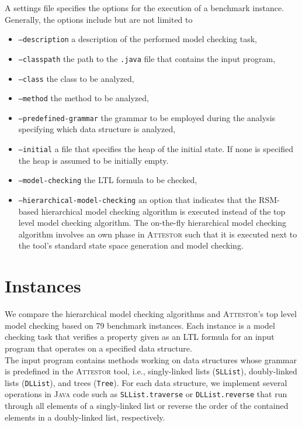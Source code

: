 \documentclass[a4paper, 12pt, twoside]{report}
\begin{document}
	A settings file specifies the options for the execution of a benchmark instance. Generally, the options include but are not limited to
	
	\begin{itemize}
		\item \texttt{--description} a description of the performed model checking task,
		\item \texttt{--classpath} the path to the \texttt{.java} file that contains the input program,
		\item \texttt{--class} the class to be analyzed,
		\item \texttt{--method} the method to be analyzed,
		\item \texttt{--predefined-grammar} the grammar to be employed during the analysis specifying which data structure is analyzed,
		\item \texttt{--initial} a file that specifies the heap of the initial state. If none is specified the heap is assumed to be initially empty.
		\item \texttt{--model-checking} the LTL formula to be checked,
		\item \texttt{--hierarchical-model-checking} an option that indicates that the RSM-based hierarchical model checking algorithm is executed instead of the top level model checking algorithm. The on-the-fly hierarchical model checking algorithm involves an own phase in \textsc{Attestor} such that it is executed next to the tool's standard state space generation and model checking. 
	\end{itemize} 
	
	\section{Instances}
	
	We compare the hierarchical model checking algorithms and \textsc{Attestor}'s top level model checking based on 79 benchmark instances. Each instance is a model checking task that verifies a property given as an LTL formula for an input program that operates on a specified data structure.\\	
		
	The input program contains methods working on data structures whose grammar is predefined in the \textsc{Attestor} tool, i.e., singly-linked lists (\texttt{SLList}), doubly-linked lists (\texttt{DLList}), and trees (\texttt{Tree}). For each data structure, we implement several operations in \textsc{Java} code such as \texttt{SLList.traverse} or \texttt{DLList.reverse} that run through all elements of a singly-linked list or reverse the order of the contained elements in a doubly-linked list, respectively.\\
	
\end{document}

